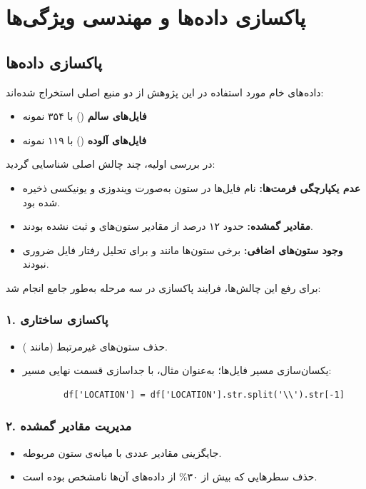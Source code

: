\chapter{پاکسازی داده‌ها و مهندسی ویژگی‌ها}

\section{پاکسازی داده‌ها} داده‌های خام مورد استفاده در این پژوهش از دو منبع اصلی استخراج شده‌اند: \begin{itemize}
    \item \textbf{فایل‌های سالم} () با ۳۵۴ نمونه
    \item \textbf{فایل‌های آلوده} () با ۱۱۹ نمونه
\end{itemize}

در بررسی اولیه، چند چالش اصلی شناسایی گردید:
\begin{itemize}
    \item \textbf{عدم یکپارچگی فرمت‌ها:} نام فایل‌ها در ستون  به‌صورت ویندوزی و یونیکسی ذخیره شده بود.
    \item \textbf{مقادیر گمشده:} حدود ۱۲ درصد از مقادیر ستون‌های  و  ثبت نشده بودند.
    \item \textbf{وجود ستون‌های اضافی:} برخی ستون‌ها مانند  و  برای تحلیل رفتار فایل ضروری نبودند.
\end{itemize}

برای رفع این چالش‌ها، فرایند پاکسازی در سه مرحله به‌طور جامع انجام شد:

\subsection{۱. پاکسازی ساختاری}
\begin{itemize}
    \item حذف ستون‌های غیرمرتبط (مانند ).
    \item یکسان‌سازی مسیر فایل‌ها؛ به‌عنوان مثال، با جداسازی قسمت نهایی مسیر:
    \begin{verbatim}
        df['LOCATION'] = df['LOCATION'].str.split('\\').str[-1]
    \end{verbatim}
\end{itemize}

\subsection{۲. مدیریت مقادیر گمشده}
\begin{itemize}
    \item جایگزینی مقادیر عددی با میانه‌ی ستون مربوطه.
    \item حذف سطرهایی که بیش از ۳۰\% از داده‌های آن‌ها نامشخص بوده است.
\end{itemize}

